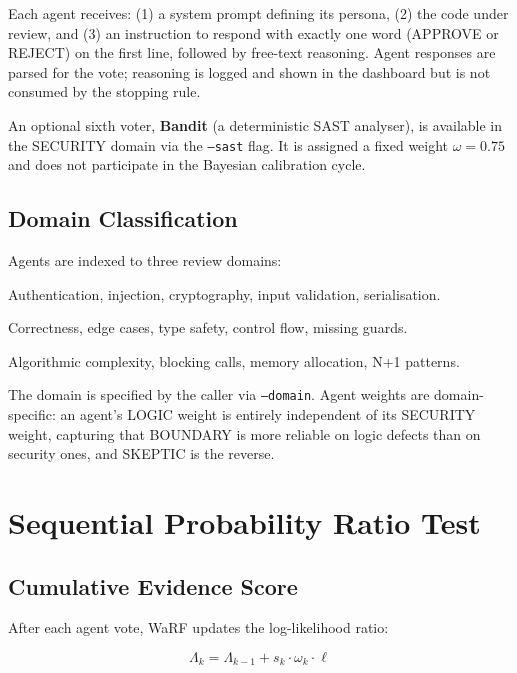 \documentclass[11pt,a4paper]{article}
\begin{document}
Each agent receives: (1) a system prompt defining its persona, (2) the
code under review, and (3) an instruction to respond with exactly one word
(APPROVE or REJECT) on the first line, followed by free-text reasoning.
Agent responses are parsed for the vote; reasoning is logged and shown in
the dashboard but is not consumed by the stopping rule.

An optional sixth voter, \textbf{Bandit} (a deterministic SAST analyser),
is available in the SECURITY domain via the \texttt{--sast} flag.
It is assigned a fixed weight $\omega = 0.75$ and does not participate in
the Bayesian calibration cycle.

\subsection{Domain Classification}

Agents are indexed to three review domains:

\begin{description}[leftmargin=2.5cm,style=sameline]
  \item[\textsc{Security}] Authentication, injection, cryptography, input validation, serialisation.
  \item[\textsc{Logic}]    Correctness, edge cases, type safety, control flow, missing guards.
  \item[\textsc{Performance}] Algorithmic complexity, blocking calls, memory allocation, N+1 patterns.
\end{description}

The domain is specified by the caller via \texttt{--domain}.
Agent weights are domain-specific: an agent's LOGIC weight is entirely
independent of its SECURITY weight, capturing that BOUNDARY is more
reliable on logic defects than on security ones, and SKEPTIC is the
reverse.

\section{Sequential Probability Ratio Test}

\subsection{Cumulative Evidence Score}

After each agent vote, WaRF updates the log-likelihood ratio:

\begin{equation}
  \Lambda_k = \Lambda_{k-1} + s_k \cdot \omega_k \cdot \ell
  \label{eq:lambda}
\end{equation}
\end{document}
